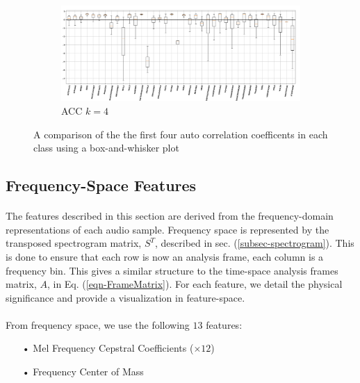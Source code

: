 \documentclass[12pt,letterpaper]{article}
\begin{document}
\begin{figure}[H]
\begin{center}
	\begin{subfigure}{1.0\textwidth}
	\centering
	\includegraphics[width=\textwidth , height=0.2\textheight]
		{../FiguresFeatures/Auto_Correlation_4}
	\caption{ACC $k=4$}
	\end{subfigure}	
	
\end{center}
\caption{A comparison of the the first four auto correlation coefficents in each class using a box-and-whisker plot}
\label{fig-FeatureACC}
\end{figure}


\newpage

\subsection{Frequency-Space Features}
\label{subsec-frequency}

\paragraph*{}The features described in this section are derived from the frequency-domain representations of each audio sample. Frequency space is represented by the transposed spectrogram matrix, $S^T$, described in sec. (\ref{subsec-spectrogram}). This is done to ensure that each  row is now an analysis frame, each column is a frequency bin. This gives a similar structure to the time-space analysis frames matrix, $A$, in Eq. (\ref{eqn-FrameMatrix}).
For each feature, we detail the physical significance and provide a visualization in feature-space.

\paragraph*{}From frequency space, we use the following $13$ features:
\begin{itemize}
\item[•] Mel Frequency Cepstral Coefficients ($\times 12$)
\item[•] Frequency Center of Mass
\end{itemize}
\end{document}
